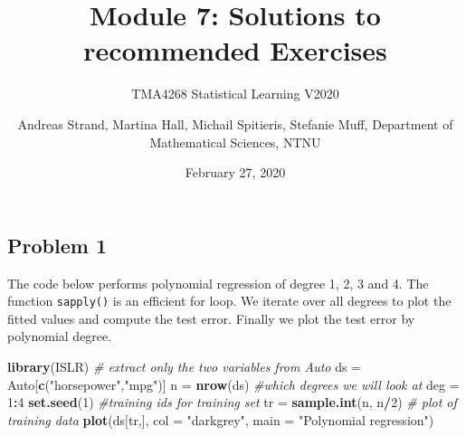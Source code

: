 \documentclass[]{article}
\title{Module 7: Solutions to recommended Exercises}
\subtitle{TMA4268 Statistical Learning V2020}
\author{Andreas Strand, Martina Hall, Michail Spitieris, Stefanie Muff,
Department of Mathematical Sciences, NTNU}
\date{February 27, 2020}
\newenvironment{Shaded}{\begin{snugshade}}{\end{snugshade}}
\newcommand{\KeywordTok}[1]{\textcolor[rgb]{0.13,0.29,0.53}{\textbf{#1}}}
\newcommand{\DataTypeTok}[1]{\textcolor[rgb]{0.13,0.29,0.53}{#1}}
\newcommand{\DecValTok}[1]{\textcolor[rgb]{0.00,0.00,0.81}{#1}}
\newcommand{\StringTok}[1]{\textcolor[rgb]{0.31,0.60,0.02}{#1}}
\newcommand{\CommentTok}[1]{\textcolor[rgb]{0.56,0.35,0.01}{\textit{#1}}}
\newcommand{\OperatorTok}[1]{\textcolor[rgb]{0.81,0.36,0.00}{\textbf{#1}}}
\newcommand{\NormalTok}[1]{#1}
\begin{document}
\maketitle

\subsection{Problem 1}\label{problem-1}

The code below performs polynomial regression of degree 1, 2, 3 and 4.
The function \texttt{sapply()} is an efficient for loop. We iterate over
all degrees to plot the fitted values and compute the test error.
Finally we plot the test error by polynomial degree.

\begin{Shaded}
\begin{Highlighting}[]
\KeywordTok{library}\NormalTok{(ISLR)}
\CommentTok{# extract only the two variables from Auto}
\NormalTok{ds =}\StringTok{ }\NormalTok{Auto[}\KeywordTok{c}\NormalTok{(}\StringTok{"horsepower"}\NormalTok{,}\StringTok{"mpg"}\NormalTok{)]}
\NormalTok{n =}\StringTok{ }\KeywordTok{nrow}\NormalTok{(ds)}
\CommentTok{#which degrees we will look at}
\NormalTok{deg =}\StringTok{ }\DecValTok{1}\OperatorTok{:}\DecValTok{4}
\KeywordTok{set.seed}\NormalTok{(}\DecValTok{1}\NormalTok{)}
\CommentTok{#training ids for training set}
\NormalTok{tr =}\StringTok{ }\KeywordTok{sample.int}\NormalTok{(n, n}\OperatorTok{/}\DecValTok{2}\NormalTok{)}
\CommentTok{# plot of training data}
\KeywordTok{plot}\NormalTok{(ds[tr,], }\DataTypeTok{col =} \StringTok{"darkgrey"}\NormalTok{, }\DataTypeTok{main =} \StringTok{"Polynomial regression"}\NormalTok{)}


\end{Highlighting}
\end{Shaded}
\end{document}
